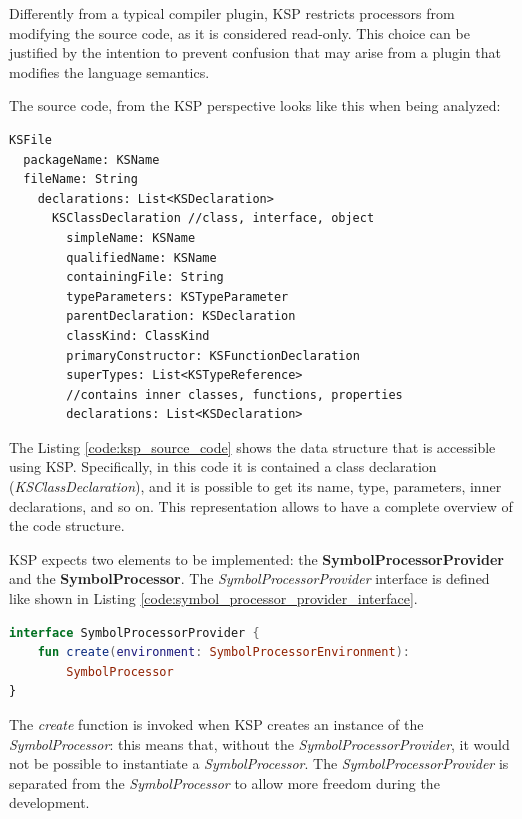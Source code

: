 Differently from a typical compiler plugin, KSP restricts processors from modifying the source code, as it is considered read-only. This choice can be justified by the intention to prevent confusion that may arise from a plugin that modifies the language semantics.

The source code, from the KSP perspective looks like this when being analyzed:
\begin{lstlisting}[caption={The source code from KSP perspective}, captionpos=b, label={code:ksp_source_code}]
KSFile
  packageName: KSName
  fileName: String
    declarations: List<KSDeclaration>
      KSClassDeclaration //class, interface, object
        simpleName: KSName
        qualifiedName: KSName
        containingFile: String
        typeParameters: KSTypeParameter
        parentDeclaration: KSDeclaration
        classKind: ClassKind
        primaryConstructor: KSFunctionDeclaration
        superTypes: List<KSTypeReference>
        //contains inner classes, functions, properties
        declarations: List<KSDeclaration>    
\end{lstlisting}
The Listing \ref{code:ksp_source_code} shows the data structure that is accessible using KSP. Specifically, in this code it is contained a class declaration (\textit{KSClassDeclaration}), and it is possible to get its name, type, parameters, inner declarations, and so on.\newline
This representation allows to have a complete overview of the code structure.

KSP expects two elements to be implemented: the \textbf{SymbolProcessorProvider} and the \textbf{SymbolProcessor}.\newline
The \textit{SymbolProcessorProvider} interface is defined like shown in Listing \ref{code:symbol_processor_provider_interface}.
\begin{lstlisting}[caption={SymbolProcessorProvider interface}, language=Kotlin, captionpos=b, label={code:symbol_processor_provider_interface}]
interface SymbolProcessorProvider {
    fun create(environment: SymbolProcessorEnvironment):
        SymbolProcessor
}
\end{lstlisting}
The \textit{create} function is invoked when KSP creates an instance of the \textit{SymbolProcessor}: this means that, without the \textit{SymbolProcessorProvider}, it would not be possible to instantiate a \textit{SymbolProcessor}. The \textit{SymbolProcessorProvider} is separated from the \textit{SymbolProcessor} to allow more freedom during the development.

